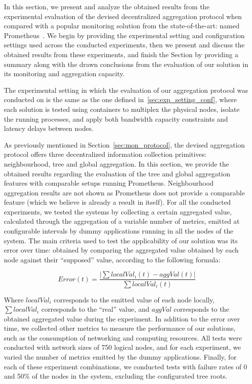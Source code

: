

In this section, we present and analyze the obtained results from the experimental evaluation of the devised decentralized aggregation protocol when compared with a popular monitoring solution from the state-of-the-art: named Prometheus~\cite{prometheus}. We begin by providing the experimental setting and configuration settings used across the conducted experiments, then we present and discuss the obtained results from these experiments, and finish the Section by providing a summary along with the drawn conclusions from the evaluation of our solution in its monitoring and aggregation capacity.

The experimental setting in which the evaluation of our aggregation protocol was conducted on is the same as the one defined in~\ref{sec:exp_setting_conf}, where each solution is tested using containers to multiplex the physical nodes, isolate the running processes, and apply both bandwidth capacity constraints and latency delays between nodes.

As previously mentioned in Section~\ref{sec:mon_protocol}, the devised aggregation protocol offers three decentralized information collection primitives: neighbourhood, tree and global aggregation. In this section, we provide the obtained results regarding the evaluation of the tree and global aggregation features with comparable setups running Prometheus. Neighbourhood aggregation results are not shown as Prometheus does not provide a comparable feature (which we believe is already a result in itself). For all the conducted experiments, we tested the systems by collecting a certain aggregated value, calculated through the aggregation of a variable number of metrics, emitted at configurable intervals by dummy applications running in all the nodes of the system. The main criteria used to test the applicability of our solution was its error over time: obtained by comparing the aggregated value obtained by each node against their ``supposed'' value, according to the following formula: 

\[ Error(t) =  \frac{|\sum localVal_i(t) - aggVal(t)|}{\sum localVal_i(t)}\]

Where $localVal_i$ corresponds to the emitted value of each node locally, $\sum localVal_i$ corresponds to the ``real'' value, and $aggVal$ corresponds to the obtained aggregated value during the experiment. In addition to the error over time, we collected other metrics to measure the performance of our solutions, such as the consumption of networking and computing resources. All tests were conducted with network sizes of 750 logical nodes, and for each experiment, we varied the number of metrics emitted by the dummy applications. Finally, for each of these experiment combinations, we conducted tests with failure rates of 0 and 50\% of the nodes in the system, excluding the configurated tree roots.

